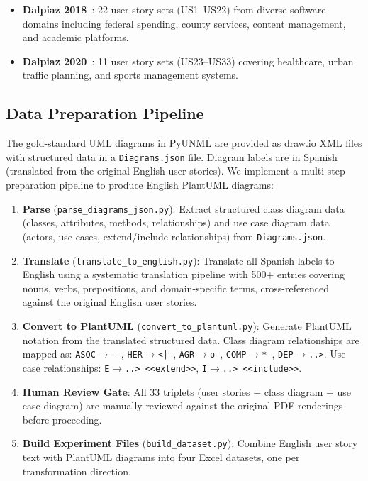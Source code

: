 \documentclass[lettersize,journal]{IEEEtran}
\begin{document}
\begin{itemize}
    \item \textbf{Dalpiaz 2018}~\cite{dalpiaz2018}: 22 user story sets (US1--US22) from diverse software domains including federal spending, county services, content management, and academic platforms.
    \item \textbf{Dalpiaz 2020}~\cite{dalpiaz2020}: 11 user story sets (US23--US33) covering healthcare, urban traffic planning, and sports management systems.
\end{itemize}

\subsection{Data Preparation Pipeline}

The gold-standard UML diagrams in PyUNML are provided as draw.io XML files with structured data in a \texttt{Diagrams.json} file. Diagram labels are in Spanish (translated from the original English user stories). We implement a multi-step preparation pipeline to produce English PlantUML diagrams:

\begin{enumerate}
    \item \textbf{Parse} (\texttt{parse\_diagrams\_json.py}): Extract structured class diagram data (classes, attributes, methods, relationships) and use case diagram data (actors, use cases, extend/include relationships) from \texttt{Diagrams.json}.

    \item \textbf{Translate} (\texttt{translate\_to\_english.py}): Translate all Spanish labels to English using a systematic translation pipeline with 500+ entries covering nouns, verbs, prepositions, and domain-specific terms, cross-referenced against the original English user stories.

    \item \textbf{Convert to PlantUML} (\texttt{convert\_to\_plantuml.py}): Generate PlantUML notation from the translated structured data. Class diagram relationships are mapped as: \texttt{ASOC}$\rightarrow$\texttt{-{}-}, \texttt{HER}$\rightarrow$\texttt{<|--}, \texttt{AGR}$\rightarrow$\texttt{o--}, \texttt{COMP}$\rightarrow$\texttt{*--}, \texttt{DEP}$\rightarrow$\texttt{..>}. Use case relationships: \texttt{E}$\rightarrow$\texttt{..>~<<extend>>}, \texttt{I}$\rightarrow$\texttt{..>~<<include>>}.

    \item \textbf{Human Review Gate}: All 33 triplets (user stories + class diagram + use case diagram) are manually reviewed against the original PDF renderings before proceeding.

    \item \textbf{Build Experiment Files} (\texttt{build\_dataset.py}): Combine English user story text with PlantUML diagrams into four Excel datasets, one per transformation direction.
\end{enumerate}
\end{document}
